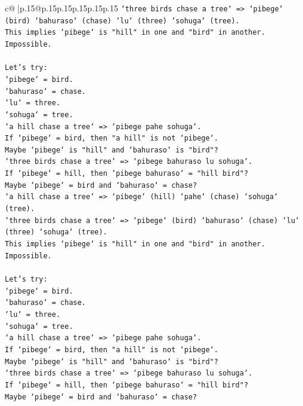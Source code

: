 \documentclass{article}
\begin{document}
{\begin{supertabular}{c@{$\;$}|p{.15\linewidth}@{}p{.15\linewidth}p{.15\linewidth}p{.15\linewidth}p{.15\linewidth}p{.15\linewidth}}
{{{\texttt{`three birds chase a tree` => `pibege` (bird) `bahuraso` (chase) `lu` (three) `sohuga` (tree).} \\
\texttt{This implies `pibege` is "hill" in one and "bird" in another. Impossible.} \\
\\ 
\texttt{Let's try:} \\
\texttt{`pibege` = bird.} \\
\texttt{`bahuraso` = chase.} \\
\texttt{`lu` = three.} \\
\texttt{`sohuga` = tree.} \\
\texttt{`a hill chase a tree` => `pibege pahe sohuga`.} \\
\texttt{If `pibege` = bird, then "a hill" is not `pibege`.} \\
\texttt{Maybe `pibege` is "hill" and `bahuraso` is "bird"?} \\
\texttt{`three birds chase a tree` => `pibege bahuraso lu sohuga`.} \\
\texttt{If `pibege` = hill, then `pibege bahuraso` = "hill bird"?} \\
\texttt{Maybe `pibege` = bird and `bahuraso` = chase?} \\
\texttt{`a hill chase a tree` => `pibege` (hill) `pahe` (chase) `sohuga` (tree).} \\
\texttt{`three birds chase a tree` => `pibege` (bird) `bahuraso` (chase) `lu` (three) `sohuga` (tree).} \\
\texttt{This implies `pibege` is "hill" in one and "bird" in another. Impossible.} \\
\\ 
\texttt{Let's try:} \\
\texttt{`pibege` = bird.} \\
\texttt{`bahuraso` = chase.} \\
\texttt{`lu` = three.} \\
\texttt{`sohuga` = tree.} \\
\texttt{`a hill chase a tree` => `pibege pahe sohuga`.} \\
\texttt{If `pibege` = bird, then "a hill" is not `pibege`.} \\
\texttt{Maybe `pibege` is "hill" and `bahuraso` is "bird"?} \\
\texttt{`three birds chase a tree` => `pibege bahuraso lu sohuga`.} \\
\texttt{If `pibege` = hill, then `pibege bahuraso` = "hill bird"?} \\
\texttt{Maybe `pibege` = bird and `bahuraso` = chase?} \\
}}}
\end{supertabular}}
\end{document}
